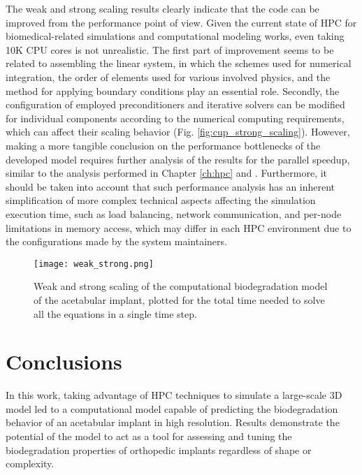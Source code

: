 The weak and strong scaling results clearly indicate that the code can be improved from the performance point of view. Given the current state of \gls{HPC} for biomedical-related simulations and computational modeling works,  even taking 10K \gls{CPU} cores is not unrealistic. The first part of improvement seems to be related to assembling the linear system, in which the schemes used for numerical integration, the order of elements used for various involved physics, and the method for applying boundary conditions play an essential role. Secondly, the configuration of employed preconditioners and iterative solvers can be modified for individual components according to the numerical computing requirements, which can affect their scaling behavior (Fig. \ref{fig:cup_strong_scaling}). However, making a more tangible conclusion on the performance bottlenecks of the developed model requires further analysis of the results for the parallel speedup, similar to the analysis performed in Chapter \ref{ch:hpc} and \cite{Barzegari2022}. Furthermore, it should be taken into account that such performance analysis has an inherent simplification of more complex technical aspects affecting the simulation execution time, such as load balancing, network communication, and per-node limitations in memory access, which may differ in each \gls{HPC} environment due to the configurations made by the system maintainers.

\begin{figure}[h]
\centering
\medskip
\texttt{[image: weak\_strong.png]}
\caption[Weak and strong scaling of the acetabular implant model]{Weak and strong scaling of the computational biodegradation model of the acetabular implant, plotted for the total time needed to solve all the equations in a single time step.} \label{fig:cup_weak_strong}
\end{figure}


\section{Conclusions}

In this work, taking advantage of \gls{HPC} techniques to simulate a large-scale 3D model led to a computational model capable of predicting the biodegradation behavior of an acetabular implant in high resolution. Results demonstrate the potential of the model to act as a tool for assessing and tuning the biodegradation properties of orthopedic implants regardless of shape or complexity.

